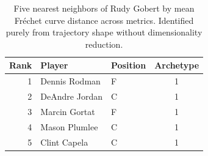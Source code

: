 \begin{table}[htbp]
  \centering\small
  \begin{tabular}{rllc}
    \toprule
    Rank & Player & Position & Archetype \\
    \midrule
    1 & Dennis Rodman & F & 1 \\
    2 & DeAndre Jordan & C & 1 \\
    3 & Marcin Gortat & F & 1 \\
    4 & Mason Plumlee & C & 1 \\
    5 & Clint Capela & C & 1 \\
    \bottomrule
  \end{tabular}
  \caption{Five nearest neighbors of Rudy Gobert by mean Fr\'{e}chet curve distance across metrics. Identified purely from trajectory shape without dimensionality reduction.}
  \label{tab:Rudy_Gobert_frechet_curve_neighbors}
\end{table}

